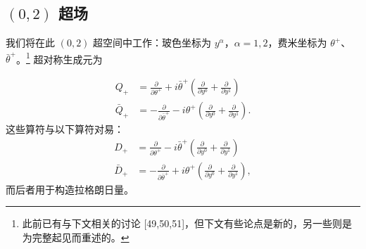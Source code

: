 \subsection{$(0,2)$ 超场}

我们将在此 $(0,2)$ 超空间中工作：玻色坐标为 $y^\alpha$，$\alpha=1,2$，费米坐标为 $\theta^+$、$\bar\theta^+$。\footnote{此前已有与下文相关的讨论 [49,50,51]，但下文有些论点是新的，另一些则是为完整起见而重述的。} 超对称生成元为

\begin{equation}
\begin{aligned} Q_+ &= \frac{\partial}{\partial\theta^+}+i\bar\theta^+\left(\frac{\partial}{\partial y^0}+\frac{\partial}{\partial y^1}\right)\\ \bar Q_+ &= -\frac{\partial}{\partial\bar\theta^+}-i\theta^+\left(\frac{\partial}{\partial y^0}+\frac{\partial}{\partial y^1}\right). \end{aligned}\tag{6.1}
\end{equation}
这些算符与以下算符对易：
\begin{equation}
\begin{aligned} D_+ &= \frac{\partial}{\partial\theta^+}-i\bar\theta^+\left(\frac{\partial}{\partial y^0}+\frac{\partial}{\partial y^1}\right)\\ \bar D_+ &= -\frac{\partial}{\partial\bar\theta^+}+i\theta^+\left(\frac{\partial}{\partial y^0}+\frac{\partial}{\partial y^1}\right), \end{aligned}\tag{6.2}
\end{equation}
\label{op:76}
而后者用于构造拉格朗日量。


